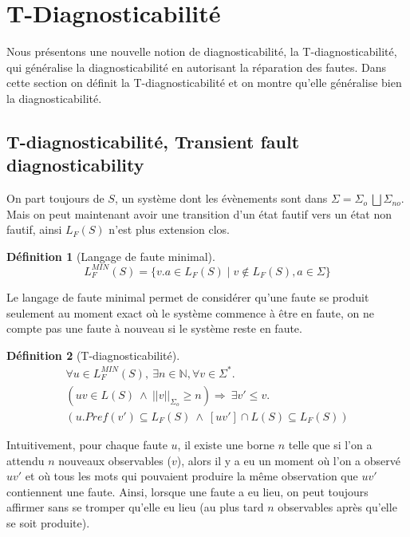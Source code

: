 \documentclass[conference]{IEEEtran}
\newtheorem{mydef}{D\'efinition}
\begin{document}

\section{T-Diagnosticabilité}

Nous présentons une nouvelle notion de diagnosticabilité, la T-diagnosticabilité,  qui généralise la diagnosticabilité en autorisant la réparation des fautes. Dans cette section on définit la T-diagnosticabilité et on montre qu'elle généralise bien la diagnosticabilité.

\subsection{T-diagnosticabilité, Transient fault diagnosticability}
On part toujours de $S$, un système dont les évènements sont dans $\Sigma = \Sigma_o \ \bigsqcup \Sigma_{no}$. Mais on peut maintenant avoir une transition d'un état fautif vers un état non fautif, ainsi $L_F(S)$ n'est plus extension clos.

\begin{mydef}[Langage de faute minimal]

$$L_{F}^{MIN}(S) =  \{v.a \in L_F(S) \mid v\not \in L_F(S), a\in \Sigma \} $$
\end{mydef}

Le langage de faute minimal permet de considérer qu'une faute se produit seulement au moment exact où le système commence à être en faute, on ne compte pas une faute à nouveau si le système reste en faute.

\begin{mydef}[T-diagnosticabilité]

$$\begin{array}{l}
\forall u \in L^{MIN}_F(S),\ \exists n \in \mathbb{N}, \forall v \in \Sigma^*.\\
(uv \in L(S) \ \wedge \  ||v||_{\Sigma_o}\geq n) \Rightarrow \ \exists v' \leq v. \\
(u.Pref(v') \subseteq L_F(S) \ \wedge \  [uv'] \cap L(S) \subseteq L_F(S))
\end{array}$$

\end{mydef}

Intuitivement, pour chaque faute $u$, il existe une borne $n$ telle que si l'on a attendu $n$ nouveaux observables ($v$), alors il y a eu un moment où l'on a observé $uv'$ et où tous les mots qui pouvaient produire la m\^eme observation que $uv'$ contiennent une faute. Ainsi, lorsque une faute a eu lieu, on peut toujours affirmer sans se tromper qu'elle eu lieu (au plus tard $n$ observables après qu'elle se soit produite).
\end{document}
